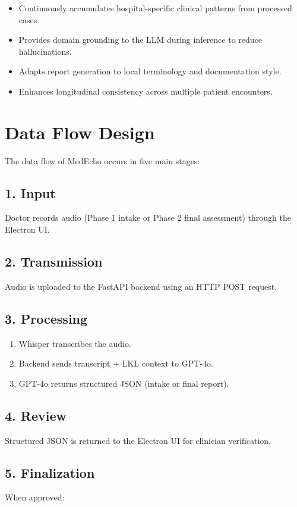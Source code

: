 \begin{itemize}
    \item Continuously accumulates hospital-specific clinical patterns from processed cases.
    \item Provides domain grounding to the LLM during inference to reduce hallucinations.
    \item Adapts report generation to local terminology and documentation style.
    \item Enhances longitudinal consistency across multiple patient encounters.
\end{itemize}

\section{Data Flow Design}
\label{sec:design:dataflow}

The data flow of MedEcho occurs in five main stages:

\subsection*{1. Input}
Doctor records audio (Phase 1 intake or Phase 2 final assessment) through the Electron UI.

\subsection*{2. Transmission}
Audio is uploaded to the FastAPI backend using an HTTP POST request.

\subsection*{3. Processing}
\begin{enumerate}
    \item Whisper transcribes the audio.
    \item Backend sends transcript + LKL context to GPT-4o.
    \item GPT-4o returns structured JSON (intake or final report).
\end{enumerate}

\subsection*{4. Review}
Structured JSON is returned to the Electron UI for clinician verification.

\subsection*{5. Finalization}
When approved:

